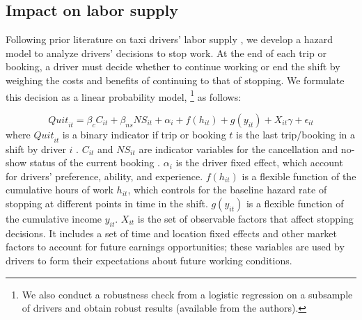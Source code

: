 \documentclass[reviewmode,AEJ]{AEA}
\begin{document}
\subsection{Impact on labor supply}
Following prior literature on taxi drivers' labor supply \citep{farber2005tomorrow,farber2015you,agarwal2015singaporean}%
, we develop a hazard model to analyze drivers' decisions to stop work. At the end of each trip or booking, a driver must decide whether
to continue working or end the shift by weighing the costs and benefits of continuing to that of stopping. 
We formulate this decision as a linear probability model,%
\footnote{%
We also conduct a robustness check from a logistic regression on a subsample of drivers and obtain robust results (available from the authors).} as follows:

\begin{equation}
\label{eq:quit}
{Quit}_{it} = \beta_{c}C_{it} + \beta_{ns} {NS}_{it} + \alpha_i +  f(h_{it}) + g(y_{it}) + X_{it}\gamma  +  \epsilon_{it}
\end{equation}
where %
${Quit}_{it}$ is a binary indicator 
 if trip or booking $t$ is the last trip/booking in a shift by driver $i$%
. $C_{it}$ and ${NS}_{it}$ are indicator variables for
the cancellation and no-show status of the current booking%
. $\alpha_i$ is the driver fixed effect, 
which account for drivers' preference, ability, and experience.
$f(h_{it})$ is a flexible function of the cumulative hours of work $h_{it}$, which controls for the baseline 
hazard rate of stopping at different points in time in the shift. $g(y_{it})$ is a flexible function 
of the cumulative income $y_{it}$.
$X_{it}$ is the set of observable factors that affect stopping decisions.  
It includes a set of time and location fixed effects and other market factors to account for 
future earnings opportunities; these variables are used by drivers to form their expectations 
about future working conditions.
\end{document}
